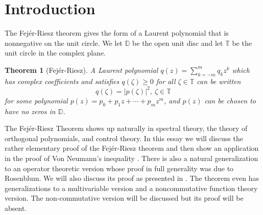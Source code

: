 \documentclass[12 pt]{article}
\theoremstyle{plain}
\newtheorem{theorem}{Theorem}[section]
\theoremstyle{definition}
\begin{document}
\restoregeometry %
\section{Introduction}
The Fej\'{e}r-Riesz theorem gives the form of a Laurent polynomial that is nonnegative on the unit circle. We let $\mathbb{D}$ be the open unit disc and let $\mathbb{T}$ be the unit circle in the complex plane.
\begin{theorem}[Fej\'{e}r-Riesz]
A Laurent polynomial $q(z)=\sum_{k=-m}^m q_k z^k$ which has complex coefficients and satisfies $q(\zeta)\geq 0$ for all $\zeta \in \mathbb{T}$  can be written 
\[q(\zeta)=|p(\zeta)|^2, \ \zeta\in \mathbb{T}\]
for some polynomial $p(z)=p_0+p_1z+ \cdots +p_m z^m$, and $p(z)$ can be chosen to have no zeros in $\mathbb{D}$. 
\end{theorem}
The Fej\'{e}r-Riesz Theorem shows up naturally in spectral theory, the theory of orthogonal polynomials, and control theory.
In this essay we will discuss the rather elementary proof of the Fej\'{e}r-Riesz theorem and then show an application in the proof of Von Neumann's inequality \cite{Paulsen}. There is also a natural generalization to an operator theoretic version whose proof in full generality was due to Rosenblum. We will also discuss its proof as presented in \cite{Dritschel}. The theorem even has generalizations to a multivariable version and a noncommutative function theory version. The non-commutative version will be discussed but its proof will be absent. 
\end{document}
